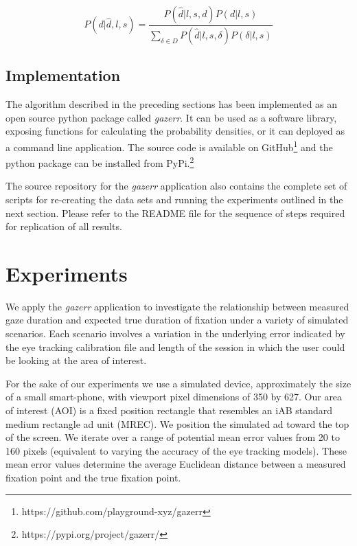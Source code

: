 \documentclass[sigconf]{acmart}
\numberwithin{equation}{section}
\begin{document}
\begin{equation}
\label{eq:p_of_d_full}
P(d|\hat{d},l,s) =  \frac{ P(\hat{d}|l,s,d) P(d|l,s) }{ \sum_{\delta \in D} P(\hat{d}|l,s,\delta) P(\delta|l,s) }
\end{equation}

\subsection{Implementation}

The algorithm described in the preceding sections has been implemented as an open source python 
package called \textit{gazerr}. 
It can be used as a software library, exposing functions for calculating the probability densities,
or it can deployed as a command line application. 
The source code is available on GitHub\footnote{https://github.com/playground-xyz/gazerr}
and the python package can be installed from PyPi.\footnote{https://pypi.org/project/gazerr/}

The source repository for the \textit{gazerr} application also contains the complete
set of scripts for re-creating the data sets and running the experiments outlined in the next 
section. Please refer to the README file for the sequence of steps required for replication
of all results.

\section{Experiments}

We apply the \textit{gazerr} application to investigate the relationship between 
measured gaze duration and expected true duration of fixation under a variety of 
simulated scenarios. 
Each scenario involves a variation in the underlying error indicated by the eye tracking 
calibration file and length of the session in which the user could be looking at 
the area of interest.

For the sake of our experiments we use a simulated device, approximately the size of a
small smart-phone, with viewport pixel dimensions of 350 by 627. 
Our area of interest (AOI) is a fixed position 
rectangle that resembles an iAB standard medium rectangle ad unit (MREC). We position the
simulated ad toward the top of the screen. 
We iterate over a range of potential mean error values from 20 to 160 pixels 
(equivalent to varying the accuracy of the eye tracking models). These mean error
values determine the average Euclidean distance 
between a measured fixation point and the true fixation point.
\end{document}
